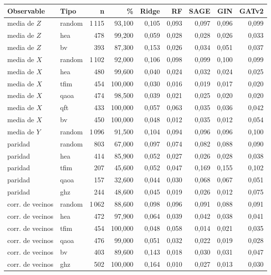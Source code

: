\begin{table}[htbp]
    \centering
    {\footnotesize
    \begin{tabular}{@{}llrrrrrrr@{}}
        \toprule
        \textbf{Observable} & \textbf{Tipo} & \textbf{n} & \textbf{\%} & \textbf{Ridge} & \textbf{RF} & \textbf{SAGE} & \textbf{GIN} & \textbf{GATv2} \\
        \midrule
        media de $Z$ & random & 1\,115 & 93,100 & 0,105 & 0,093 & 0,097 & 0,096 & 0,099 \\
        media de $Z$ & hea & 478 & 99,200 & 0,059 & 0,028 & 0,028 & 0,026 & 0,033 \\
        media de $Z$ & bv & 393 & 87,300 & 0,153 & 0,026 & 0,034 & 0,051 & 0,037 \\
        media de $X$ & random & 1\,102 & 92,000 & 0,106 & 0,098 & 0,099 & 0,100 & 0,099 \\
        media de $X$ & hea & 480 & 99,600 & 0,040 & 0,024 & 0,032 & 0,024 & 0,025 \\
        media de $X$ & tfim & 454 & 100,000 & 0,030 & 0,016 & 0,019 & 0,017 & 0,020 \\
        media de $X$ & qaoa & 474 & 98,500 & 0,039 & 0,021 & 0,025 & 0,020 & 0,020 \\
        media de $X$ & qft & 433 & 100,000 & 0,057 & 0,063 & 0,035 & 0,036 & 0,042 \\
        media de $X$ & bv & 450 & 100,000 & 0,048 & 0,012 & 0,035 & 0,012 & 0,054 \\
        media de $Y$ & random & 1\,096 & 91,500 & 0,104 & 0,094 & 0,096 & 0,096 & 0,100 \\
        paridad & random & 803 & 67,000 & 0,097 & 0,074 & 0,082 & 0,088 & 0,090 \\
        paridad & hea & 414 & 85,900 & 0,052 & 0,027 & 0,026 & 0,028 & 0,038 \\
        paridad & tfim & 207 & 45,600 & 0,052 & 0,047 & 0,169 & 0,155 & 0,102 \\
        paridad & qaoa & 157 & 32,600 & 0,044 & 0,030 & 0,068 & 0,067 & 0,051 \\
        paridad & ghz & 244 & 48,600 & 0,045 & 0,019 & 0,026 & 0,012 & 0,075 \\
        corr. de vecinos & random & 1\,062 & 88,600 & 0,098 & 0,096 & 0,091 & 0,088 & 0,091 \\
        corr. de vecinos & hea & 472 & 97,900 & 0,064 & 0,039 & 0,042 & 0,038 & 0,041 \\
        corr. de vecinos & tfim & 454 & 100,000 & 0,048 & 0,058 & 0,014 & 0,021 & 0,035 \\
        corr. de vecinos & qaoa & 476 & 99,000 & 0,051 & 0,032 & 0,022 & 0,019 & 0,028 \\
        corr. de vecinos & bv & 403 & 89,600 & 0,143 & 0,018 & 0,030 & 0,031 & 0,047 \\
        corr. de vecinos & ghz & 502 & 100,000 & 0,164 & 0,010 & 0,027 & 0,013 & 0,030 \\
        \bottomrule
    \end{tabular}}


\end{table}
